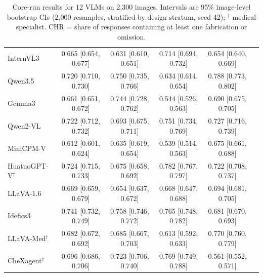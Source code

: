 \begin{table}[t]
\begin{tabular}{lccccc}
InternVL3 & 0.665 [0.654, 0.677] & 0.631 [0.610, 0.651] & 0.714 [0.694, 0.732] & 0.654 [0.640, 0.669] \\
Qwen3.5 & 0.720 [0.710, 0.730] & 0.750 [0.735, 0.766] & 0.634 [0.614, 0.654] & 0.788 [0.773, 0.802] \\
Gemma3 & 0.661 [0.651, 0.672] & 0.744 [0.728, 0.762] & 0.544 [0.526, 0.563] & 0.690 [0.675, 0.705] \\
Qwen2-VL & 0.722 [0.712, 0.732] & 0.693 [0.675, 0.711] & 0.751 [0.734, 0.769] & 0.727 [0.716, 0.739] \\
MiniCPM-V & 0.612 [0.601, 0.624] & 0.635 [0.619, 0.654] & 0.539 [0.514, 0.563] & 0.675 [0.661, 0.688] \\
HuatuoGPT-V$^{\dagger}$ & 0.724 [0.715, 0.733] & 0.675 [0.658, 0.692] & 0.782 [0.767, 0.797] & 0.722 [0.708, 0.737] \\
LLaVA-1.6 & 0.669 [0.659, 0.679] & 0.654 [0.637, 0.672] & 0.668 [0.647, 0.688] & 0.694 [0.681, 0.705] \\
Idefics3 & 0.741 [0.732, 0.749] & 0.758 [0.746, 0.772] & 0.765 [0.748, 0.782] & 0.681 [0.670, 0.693] \\
LLaVA-Med$^{\dagger}$ & 0.682 [0.672, 0.692] & 0.685 [0.667, 0.703] & 0.613 [0.592, 0.633] & 0.770 [0.760, 0.779] \\
CheXagent$^{\dagger}$ & 0.696 [0.686, 0.706] & 0.723 [0.706, 0.740] & 0.769 [0.749, 0.788] & 0.561 [0.552, 0.571] \\
\bottomrule
\end{tabular}
\caption{Core-run results for 12 VLMs on 2,300 images. Intervals are 95\% image-level bootstrap CIs (2,000 resamples, stratified by design stratum, seed 42); $^{\dagger}$ medical specialist. CHR = share of responses containing at least one fabrication or omission.}
\label{tab:main}
\end{table}
